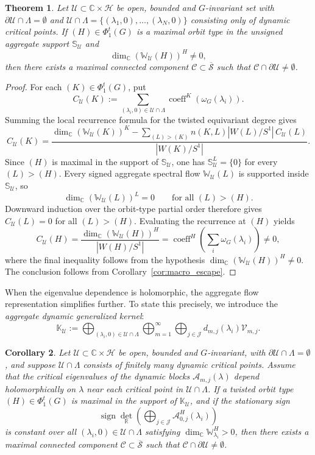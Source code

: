 \documentclass[twoside,11pt]{article}
\def\bc{{\mathbb{C}}}
\def\br{{\mathbb{R}}}
\newtheorem{theorem}{Theorem}[section]
\newtheorem{corollary}[theorem]{Corollary}
\begin{document}
\begin{theorem}\label{thm:macroscopic_escape}
Let $\mathcal U\subset\bc\times\mathscr H$ be open, bounded and
$G$-invariant set with $\partial\mathcal U\cap\Lambda=\emptyset$ and
$\mathcal U\cap\Lambda=\{(\lambda_1,0),\ldots,(\lambda_N,0)\}$ consisting only of dynamic critical points. If $(H)\in\Phi_1^t(G)$ is a maximal orbit type in the unsigned aggregate support $\mathbb S_{\mathcal U}$ and
\[
\dim_\bc
\left(
\mathbb W_{\mathcal U}(H)
\right)^H
\neq 0,
\]
then there exists a maximal connected component $\mathscr C\subset\overline{\mathscr S}$ such that $\mathscr C\cap\partial\mathcal U\neq\emptyset$.
\end{theorem}
\begin{proof}
For each $(K)\in\Phi_1^t(G)$, put
\[
C_{\mathcal U}(K)
:=
\sum_{(\lambda_i,0)\in\mathcal U\cap\Lambda}
\operatorname{coeff}^K(\omega_G(\lambda_i)).
\]
Summing the local recurrence formula for the twisted equivariant degree gives
\[
C_{\mathcal U}(K)
=
\frac{
\dim_\bc \left(\mathbb W_{\mathcal U}(K) \right)^K - \sum_{(L)>(K)}
n(K,L)|W(L)/S^1|\,C_{\mathcal U}(L)}
{|W(K)/S^1|}.
\]
Since $(H)$ is maximal in the support of $\mathbb S_{\mathcal U}$, one has $\mathbb S_{\mathcal U}^L=\{0\}$ for every $(L)>(H)$. Every signed aggregate spectral flow $\mathbb W_{\mathcal U}(L)$ is supported inside $\mathbb S_{\mathcal U}$, so
\[
\dim_\bc \left( \mathbb W_{\mathcal U}(L)
\right)^L =0
\qquad \text{for all } (L)>(H).
\]
Downward induction over the orbit-type partial order therefore gives $C_{\mathcal U}(L)=0$ for all $(L)>(H)$. Evaluating the recurrence at $(H)$ yields
\[
C_{\mathcal U}(H)
= \frac{ \dim_\bc \left(\mathbb W_{\mathcal U}(H) \right)^H} {|W(H)/S^1|}
= \operatorname{coeff}^H \left( \sum_i\omega_G(\lambda_i) \right) \neq 0,
\]
where the final inequality follows from the hypothesis $\dim_\bc(\mathbb W_{\mathcal U}(H))^H\neq0$. The conclusion follows from Corollary~\ref{cor:macro_escape}.
\end{proof}
When the eigenvalue dependence is holomorphic, the aggregate flow representation simplifies further. To state this precisely, we introduce the \emph{aggregate dynamic generalized kernel}:
\[
\mathbb K_{\mathcal U}
:=
\bigoplus_{(\lambda_i,0)\in\mathcal U\cap\Lambda} \bigoplus_{m=1}^{\infty} \bigoplus_{j\in\mathcal J} d_{m,j}(\lambda_i)\mathcal V_{m,j}.
\]
\begin{corollary}\label{cor:holomorphic_escape}
Let $\mathcal U\subset\bc\times\mathscr H$ be open, bounded and $G$-invariant, with $\partial\mathcal U\cap\Lambda=\emptyset$, and suppose $\mathcal U\cap\Lambda$ consists of finitely many dynamic critical points. Assume that the critical eigenvalues of the dynamic blocks $\mathscr A_{m,j}(\lambda)$ depend holomorphically on $\lambda$ near each critical point in $\mathcal U\cap\Lambda$. 
If a twisted orbit type $(H)\in\Phi_1^t(G)$ is maximal in the support of $\mathbb K_{\mathcal U}$, and if the stationary sign
\[
\operatorname{sign} \det_\br
\left(\bigoplus_{j\in\mathcal J} \mathscr A_{0,j}^H(\lambda_i) \right)
\]
is constant over all $(\lambda_i,0)\in\mathcal U\cap\Lambda$ satisfying $\dim_\bc\mathbb W_{\lambda_i}^H>0$, then there exists a maximal connected component $\mathscr C\subset\overline{\mathscr S}$ such that
$\mathscr C\cap\partial\mathcal U\neq\emptyset$.
\end{corollary}
\end{document}

